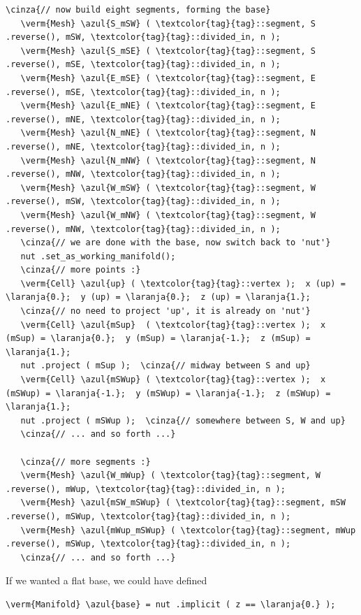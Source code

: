 \begin{Verbatim}[commandchars=\\\{\},formatcom=\small\tt,frame=single,
   label=parag-\ref{\numb section 2.\numb parag 17}.cpp,rulecolor=\color{moldura},
   baselinestretch=0.94,framesep=2mm]
   \cinza{// now build eight segments, forming the base}
   \verm{Mesh} \azul{S_mSW} ( \textcolor{tag}{tag}::segment, S .reverse(), mSW, \textcolor{tag}{tag}::divided_in, n );
   \verm{Mesh} \azul{S_mSE} ( \textcolor{tag}{tag}::segment, S .reverse(), mSE, \textcolor{tag}{tag}::divided_in, n );
   \verm{Mesh} \azul{E_mSE} ( \textcolor{tag}{tag}::segment, E .reverse(), mSE, \textcolor{tag}{tag}::divided_in, n );
   \verm{Mesh} \azul{E_mNE} ( \textcolor{tag}{tag}::segment, E .reverse(), mNE, \textcolor{tag}{tag}::divided_in, n );
   \verm{Mesh} \azul{N_mNE} ( \textcolor{tag}{tag}::segment, N .reverse(), mNE, \textcolor{tag}{tag}::divided_in, n );
   \verm{Mesh} \azul{N_mNW} ( \textcolor{tag}{tag}::segment, N .reverse(), mNW, \textcolor{tag}{tag}::divided_in, n );
   \verm{Mesh} \azul{W_mSW} ( \textcolor{tag}{tag}::segment, W .reverse(), mSW, \textcolor{tag}{tag}::divided_in, n );
   \verm{Mesh} \azul{W_mNW} ( \textcolor{tag}{tag}::segment, W .reverse(), mNW, \textcolor{tag}{tag}::divided_in, n );
   \cinza{// we are done with the base, now switch back to 'nut'}
   nut .set_as_working_manifold();
   \cinza{// more points :}
   \verm{Cell} \azul{up} ( \textcolor{tag}{tag}::vertex );  x (up) = \laranja{0.};  y (up) = \laranja{0.};  z (up) = \laranja{1.};
   \cinza{// no need to project 'up', it is already on 'nut'}
   \verm{Cell} \azul{mSup}  ( \textcolor{tag}{tag}::vertex );  x (mSup) = \laranja{0.};  y (mSup) = \laranja{-1.};  z (mSup) = \laranja{1.};
   nut .project ( mSup );  \cinza{// midway between S and up}
   \verm{Cell} \azul{mSWup} ( \textcolor{tag}{tag}::vertex );  x (mSWup) = \laranja{-1.};  y (mSWup) = \laranja{-1.};  z (mSWup) = \laranja{1.};
   nut .project ( mSWup );  \cinza{// somewhere between S, W and up}
   \cinza{// ... and so forth ...}

   \cinza{// more segments :}
   \verm{Mesh} \azul{W_mWup} ( \textcolor{tag}{tag}::segment, W .reverse(), mWup, \textcolor{tag}{tag}::divided_in, n );
   \verm{Mesh} \azul{mSW_mSWup} ( \textcolor{tag}{tag}::segment, mSW .reverse(), mSWup, \textcolor{tag}{tag}::divided_in, n );
   \verm{Mesh} \azul{mWup_mSWup} ( \textcolor{tag}{tag}::segment, mWup .reverse(), mSWup, \textcolor{tag}{tag}::divided_in, n );
   \cinza{// ... and so forth ...}
\end{Verbatim}

If we wanted a flat base, we could have defined

\begin{Verbatim}[commandchars=\\\{\},formatcom=\small\tt,baselinestretch=0.94]
   \verm{Manifold} \azul{base} = nut .implicit ( z == \laranja{0.} );
\end{Verbatim}

